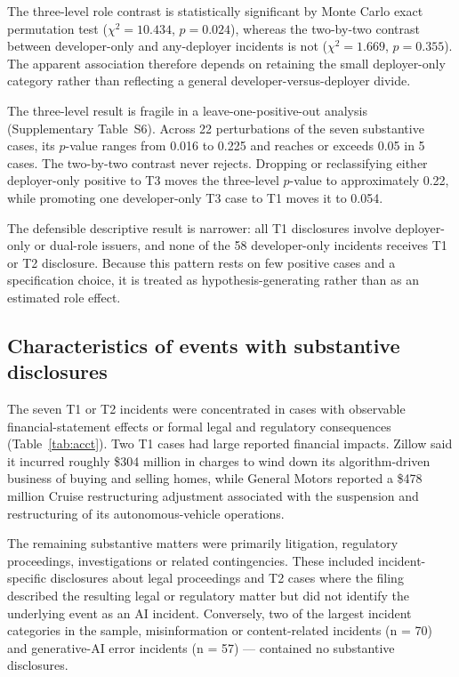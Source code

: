 \documentclass[utf8]{FrontiersinHarvard}
\begin{document}
The three-level role contrast is statistically significant by Monte Carlo exact permutation test ($\chi^2 = 10.434$, $p = 0.024$), whereas the two-by-two contrast between developer-only and any-deployer incidents is not ($\chi^2 = 1.669$, $p = 0.355$). The apparent association therefore depends on retaining the small deployer-only category rather than reflecting a general developer-versus-deployer divide.

The three-level result is fragile in a leave-one-positive-out analysis (Supplementary Table~S6). Across 22 perturbations of the seven substantive cases, its $p$-value ranges from 0.016 to 0.225 and reaches or exceeds 0.05 in 5 cases. The two-by-two contrast never rejects. Dropping or reclassifying either deployer-only positive to T3 moves the three-level $p$-value to approximately 0.22, while promoting one developer-only T3 case to T1 moves it to 0.054.

The defensible descriptive result is narrower: all T1 disclosures involve deployer-only or dual-role issuers, and none of the 58 developer-only incidents receives T1 or T2 disclosure. Because this pattern rests on few positive cases and a specification choice, it is treated as hypothesis-generating rather than as an estimated role effect.

\subsection{Characteristics of events with substantive disclosures}
The seven T1 or T2 incidents were concentrated in cases with observable financial-statement effects or formal legal and regulatory consequences (Table~\ref{tab:acct}). Two T1 cases had large reported financial impacts. Zillow said it incurred roughly \$304 million in charges to wind down its algorithm-driven business of buying and selling homes, while General Motors reported a \$478 million Cruise restructuring adjustment associated with the suspension and restructuring of its autonomous-vehicle operations.

The remaining substantive matters were primarily litigation, regulatory proceedings, investigations or related contingencies. These included incident-specific disclosures about legal proceedings and T2 cases where the filing described the resulting legal or regulatory matter but did not identify the underlying event as an AI incident. Conversely, two of the largest incident categories in the sample, misinformation or content-related incidents (n = 70) and generative-AI error incidents (n = 57) --- contained no substantive disclosures.
\end{document}
